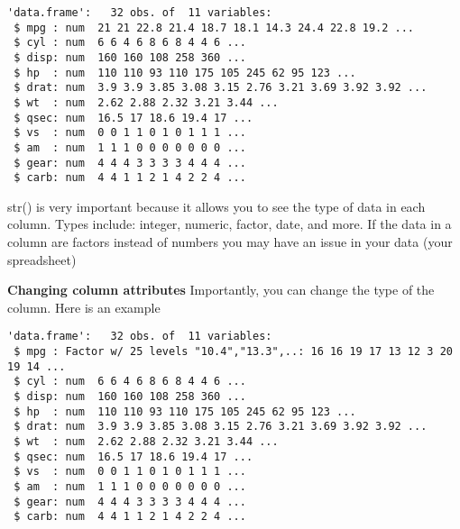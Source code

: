 \documentclass[
  letterpaper,
  DIV=11,
  numbers=noendperiod]{scrartcl}
\newenvironment{Shaded}{\begin{snugshade}}{\end{snugshade}}
\newcommand{\CommentTok}[1]{\textcolor[rgb]{0.37,0.37,0.37}{#1}}
\newcommand{\FunctionTok}[1]{\textcolor[rgb]{0.28,0.35,0.67}{#1}}
\newcommand{\NormalTok}[1]{\textcolor[rgb]{0.00,0.23,0.31}{#1}}
\newcommand{\OtherTok}[1]{\textcolor[rgb]{0.00,0.23,0.31}{#1}}
\newcommand{\SpecialCharTok}[1]{\textcolor[rgb]{0.37,0.37,0.37}{#1}}
\begin{document}
\begin{verbatim}
'data.frame':   32 obs. of  11 variables:
 $ mpg : num  21 21 22.8 21.4 18.7 18.1 14.3 24.4 22.8 19.2 ...
 $ cyl : num  6 6 4 6 8 6 8 4 4 6 ...
 $ disp: num  160 160 108 258 360 ...
 $ hp  : num  110 110 93 110 175 105 245 62 95 123 ...
 $ drat: num  3.9 3.9 3.85 3.08 3.15 2.76 3.21 3.69 3.92 3.92 ...
 $ wt  : num  2.62 2.88 2.32 3.21 3.44 ...
 $ qsec: num  16.5 17 18.6 19.4 17 ...
 $ vs  : num  0 0 1 1 0 1 0 1 1 1 ...
 $ am  : num  1 1 1 0 0 0 0 0 0 0 ...
 $ gear: num  4 4 4 3 3 3 3 4 4 4 ...
 $ carb: num  4 4 1 1 2 1 4 2 2 4 ...
\end{verbatim}

str() is very important because it allows you to see the type of data in
each column. Types include: integer, numeric, factor, date, and more. If
the data in a column are factors instead of numbers you may have an
issue in your data (your spreadsheet)

\textbf{Changing column attributes} Importantly, you can change the type
of the column. Here is an example

\begin{Shaded}
\end{Shaded}

\begin{verbatim}
'data.frame':   32 obs. of  11 variables:
 $ mpg : Factor w/ 25 levels "10.4","13.3",..: 16 16 19 17 13 12 3 20 19 14 ...
 $ cyl : num  6 6 4 6 8 6 8 4 4 6 ...
 $ disp: num  160 160 108 258 360 ...
 $ hp  : num  110 110 93 110 175 105 245 62 95 123 ...
 $ drat: num  3.9 3.9 3.85 3.08 3.15 2.76 3.21 3.69 3.92 3.92 ...
 $ wt  : num  2.62 2.88 2.32 3.21 3.44 ...
 $ qsec: num  16.5 17 18.6 19.4 17 ...
 $ vs  : num  0 0 1 1 0 1 0 1 1 1 ...
 $ am  : num  1 1 1 0 0 0 0 0 0 0 ...
 $ gear: num  4 4 4 3 3 3 3 4 4 4 ...
 $ carb: num  4 4 1 1 2 1 4 2 2 4 ...
\end{verbatim}

\begin{Shaded}
\end{Shaded}
\end{document}
